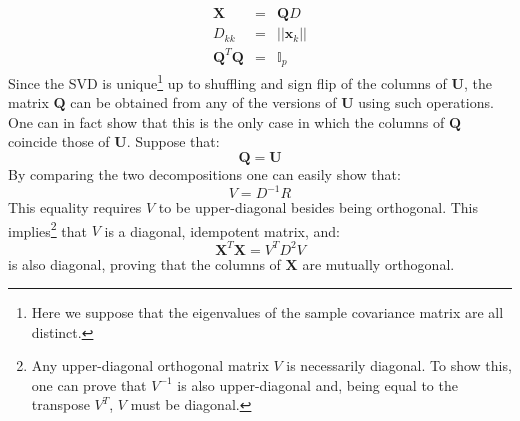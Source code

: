 \begin{eqnarray*}
    \mathbf{X} & = & \mathbf{Q} D \\
    D_{kk} & = & ||\mathbf{x}_k|| \\
    \mathbf{Q}^T \mathbf{Q} & = & \mathbb{I}_p
\end{eqnarray*}
Since the SVD is unique\footnote{Here we suppose that the eigenvalues of
    the sample covariance matrix are all distinct.} up to shuffling and sign flip
of the columns of $\mathbf{U}$, the matrix $\mathbf{Q}$ can be obtained from
any of the versions of $\mathbf{U}$ using such operations. One can in fact show that 
this is the only case in which the columns of $\mathbf{Q}$
coincide those of $\mathbf{U}$. Suppose that:
\begin{equation*}
\mathbf{Q} = \mathbf{U}
\end{equation*}
By comparing the two decompositions one can easily show that:
\begin{equation*}
V = D^{-1} R
\end{equation*}
This equality requires $V$ to be upper-diagonal besides being orthogonal. This
implies\footnote{Any upper-diagonal orthogonal matrix $V$ is necessarily diagonal. To
    show this, one can prove that $V^{-1}$ is also upper-diagonal and, being
    equal to the transpose $V^T$, $V$ must be diagonal.} that $V$ is a diagonal, idempotent matrix, and:
\begin{equation*}
\mathbf{X}^T \mathbf{X} = V^T D ^2 V
\end{equation*}
is also diagonal, proving that the columns of $\mathbf{X}$ are mutually orthogonal.